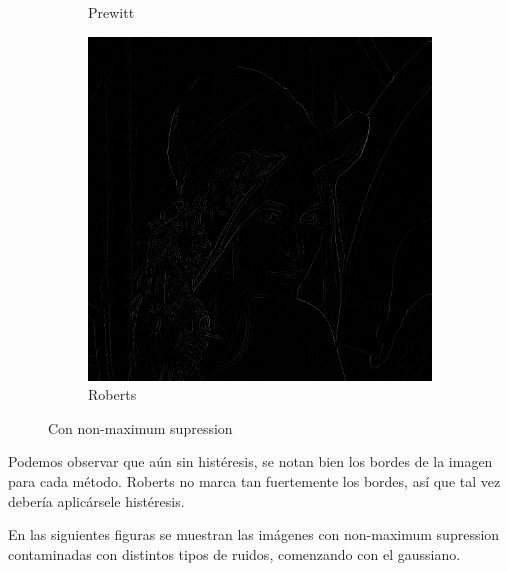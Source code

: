 \documentclass[a4paper]{article}
\begin{document}
\begin{figure}[H]
\begin{subfigure}[t]{0.3\textwidth}
	\caption{Prewitt}
	\end{subfigure}
	\begin{subfigure}[t]{0.3\textwidth}
	\centering
	\includegraphics[width=\textwidth]{imagenesInforme/lenaNonMaximumSupressionRoberts}
	\caption{Roberts}
	\end{subfigure}
\caption{Con non-maximum supression}
\end{figure}

Podemos observar que aún sin histéresis, se notan bien los bordes de la imagen para cada método. Roberts no marca tan fuertemente los bordes, así que tal vez debería aplicársele histéresis. 

En las siguientes figuras se muestran las imágenes con non-maximum supression contaminadas con distintos tipos de ruidos, comenzando con el gaussiano.
\end{document}
